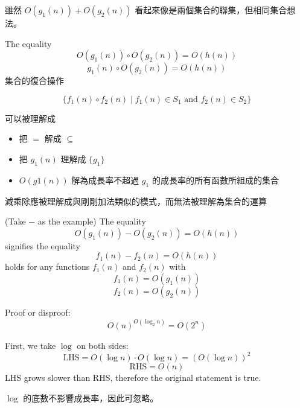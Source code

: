 \begin{remark}
    雖然 $O(g_1(n)) + O(g_2(n))$ 看起來像是兩個集合的聯集，但相同集合想法\textbf{}。
\end{remark}

\begin{definition} The equality \[
        O(g_1(n))\circ O(g_2(n)) = O(h(n))
    \]\[
        g_1(n) \circ O(g_2(n)) = O(h(n))
    \]
    集合的復合操作
    \begin{notation}
        $$
        \{f_1(n)\circ f_2(n) \; | \; f_1(n) \in S_1 \text{ and } f_2(n) \in S_2\}
        $$
    \end{notation}
    可以被理解成
    \begin{itemize}
        \item 把 $=$ 解成 $\subseteq$
        \item 把 $g_1(n)$ 理解成 $\{g_1\}$
        \item $O(g1(n))$ 解為成長率不超過 $g_1$ 的成長率的所有函數所組成的集合
    \end{itemize}
\end{definition}

\newpage

\begin{remark}
    減乘除應被理解成與剛剛加法類似的模式，而無法被理解為集合的運算
\end{remark}

\begin{definition}
    (Take $-$ as the example) The equality \[ O(g_1(n)) - O(g_2(n)) = O(h(n)) \] signifies the equality \[
        f_1(n) - f_2(n) = O(h(n))
    \]
    holds for any functions $f_1(n)$ and $f_2(n)$ with
    \[
        f_1(n) = O(g_1(n))
    \]
    \[
        f_2(n) = O(g_2(n))
    \]
\end{definition}

\begin{exercise}
    Proof or disproof: \[
        O(n)^{O(\log_2 n)} = O(2^n)
    \]
\end{exercise}
\begin{answer}
    First, we take $\log$ on both sides:
    \[
        \text{LHS} = O(\log n) \cdot O(\log n) = (O(\log n))^2
    \]    
    \[
        \text{RHS} = O(n)
    \]
    LHS grows slower than RHS, therefore the original statement is true.
\end{answer}
\begin{remark}
    $\log$ 的底數不影響成長率，因此可忽略。
\end{remark}


